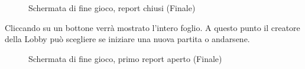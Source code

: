 \begin{figure}[H]
    \caption{Schermata di fine gioco, report chiusi (Finale)}
    \centering
    \label{fig:end_game}
\end{figure}

\noindent Cliccando su un bottone verrà mostrato l'intero foglio. A questo punto il creatore della Lobby può scegliere se iniziare una nuova partita o andarsene.

\begin{figure}[H]
    \caption{Schermata di fine gioco, primo report aperto (Finale)}
    \centering
    \label{fig:end_game_2}
\end{figure}

